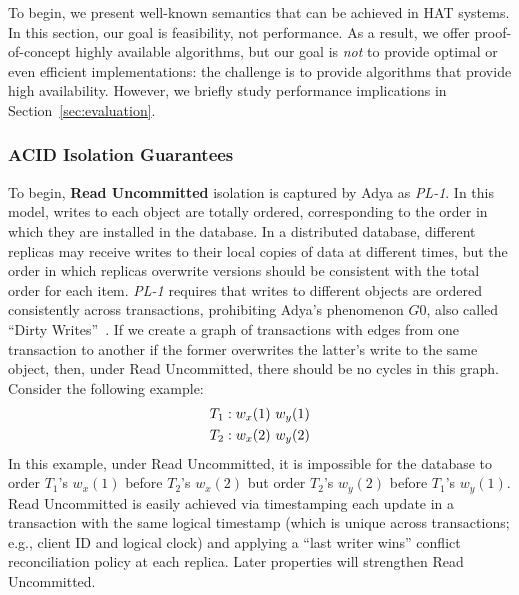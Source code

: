 To begin, we present well-known semantics that can be achieved in HAT
systems. In this section, our goal is feasibility, not performance. As
a result, we offer proof-of-concept highly available algorithms, but
our goal is \textit{not} to provide optimal or even efficient
implementations: the challenge is to provide algorithms that provide
high availability. However, we briefly study performance implications
in Section~\ref{sec:evaluation}.

\subsubsection{ACID Isolation Guarantees}

To begin, \textbf{Read Uncommitted} isolation is captured by Adya as
\textit{PL-1}. In this model, writes to each object are totally
ordered, corresponding to the order in which they are installed in the
database. In a distributed database, different replicas may receive
writes to their local copies of data at different times, but the order
in which replicas overwrite versions should be consistent with the total order for
each item. \textit{PL-1} requires that writes to different objects are
ordered consistently across transactions, prohibiting Adya's
phenomenon $G0$, also called ``Dirty Writes''~\cite{adya}. If we
create a graph of transactions with edges from one transaction to
another if the former overwrites the latter's write to the same
object, then, under Read Uncommitted, there should be no cycles in
this graph. Consider the following example:
\begin{align*}
\small\vspace{-1em}
T_1 &: w_x(1)~w_y(1)
\\T_2 &: w_x(2)~w_y(2)
\end{align*}
In this example, under Read Uncommitted, it is impossible for the
database to order $T_1$'s $w_x(1)$ before $T_2$'s $w_x(2)$ but order
$T_2$'s $w_y(2)$ before $T_1$'s $w_y(1)$.  Read Uncommitted is easily
achieved via timestamping each update in a transaction with the same
logical timestamp (which is unique across transactions; e.g., client
ID and logical clock) and applying a ``last writer wins'' conflict
reconciliation policy at each replica. Later properties will
strengthen Read Uncommitted.

